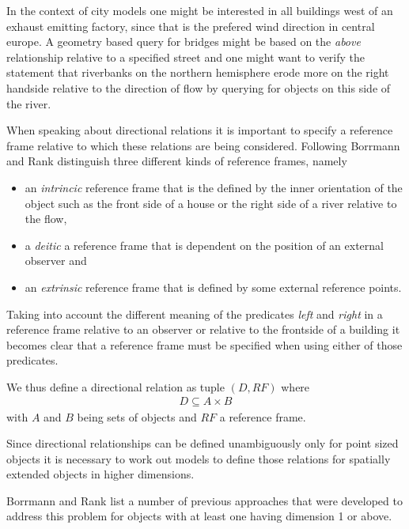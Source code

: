 \documentclass[paper=a4, fontsize=11pt]{scrartcl} %
\numberwithin{equation}{section} %
\numberwithin{figure}{section} %
\numberwithin{table}{section} %
\begin{document}
In the context of city models one might be interested in all buildings west of an exhaust emitting factory, since that is the prefered wind direction in central europe. A geometry based query for bridges might be based on the \emph{above} relationship relative to a specified street and one might want to verify the statement that riverbanks on the northern hemisphere erode more on the right handside relative to the direction of flow by querying for objects on this side of the river. 

When speaking about directional relations it is important to specify a reference frame relative to which these relations are being considered. Following \cite{Retz-Schmidt:1988:VVS:46184.46189} Borrmann and Rank \cite{Borrmann:2009:AEI} distinguish three different kinds of reference frames, namely
\begin{itemize}
\item an \emph{intrincic} reference frame that is the defined by the inner orientation of the object such as the front side of a house or the right side of a river relative to the flow,
\item a \emph{deitic} a reference frame that is dependent on the position of an external observer and 
\item an \emph{extrinsic} reference frame that is defined by some external reference points. 
\end{itemize}

Taking into account the different meaning of the predicates \emph{left} and \emph{right} in a reference frame relative to an observer or relative to the frontside of a building it becomes clear that a reference frame must be specified when using either of those predicates.

We thus define a directional relation as tuple $(D,RF)$ where  
\begin{align*}
 D \subseteq A \times B 
\end{align*}
with $A$ and $B$ being sets of objects and $RF$ a reference frame.

Since directional relationships can be defined unambiguously only for point sized objects it is necessary to work out models to define those relations for spatially extended objects in higher dimensions. 

Borrmann and Rank \cite{Borrmann:2009:AEI} list a number of previous approaches that were developed to address this problem for objects with at least one having dimension 1 or above.
\end{document}
